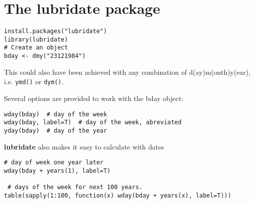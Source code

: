 \documentclass[french]{article}
\begin{document}
\section{The \textbf{lubridate} package}
\begin{framed}
\begin{verbatim}
install.packages("lubridate")
library(lubridate)
# Create an object
bday <- dmy("23121984")
\end{verbatim}
\end{framed}

This could also have been achieved with any combination of d(ay)m(onth)y(ear), i.e. \texttt{ymd()} or \texttt{dym()}.

Several options are provided to work with the bday object:

\begin{framed}
\begin{verbatim}
wday(bday)  # day of the week
wday(bday, label=T)  # day of the week, abreviated
yday(bday)  # day of the year
\end{verbatim}
\end{framed}

\textbf{lubridate} also makes it easy to calculate with dates
\begin{framed}
\begin{verbatim}
# day of week one year later
wday(bday + years(1), label=T)  

 # days of the week for next 100 years.
table(sapply(1:100, function(x) wday(bday + years(x), label=T))) 
\end{verbatim}
\end{framed}
\end{document}

